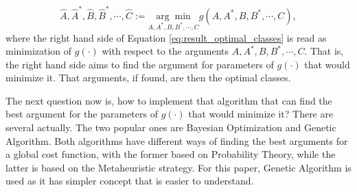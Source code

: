 \begin{equation}\label{eq:result_optimal_classes}
    \hat{A},\hat{A}^*,\hat{B},\hat{B}^*,\cdots,\hat{C}:=\underset{A,A^{*},B,B^*,\cdots,C}{\arg\min}g(A,A^*,B,B^*,\cdots,C),
\end{equation}
where the right hand side of Equation \ref{eq:result_optimal_classes} is read as minimization of $g(\cdot)$ with respect to the arguments $A,A^*,B,B^*,\cdots,C$. That is, the right hand side aims to find the argument for parameters of $g(\cdot)$ that would minimize it. That arguments, if found, are then the optimal classes.

The next question now is, how to implement that algorithm that can find the best argument for the parameters of $g(\cdot)$ that would minimize it? There are several actually. The two popular ones are Bayesian Optimization and Genetic Algorithm. Both algorithms have different ways of finding the best arguments for a global cost function, with the former based on Probability Theory, while the latter is based on the Metaheuristic strategy. For this paper, Genetic Algorithm is used as it has simpler concept that is easier to understand.

